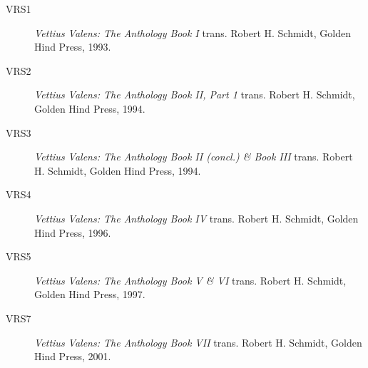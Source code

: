 \begin{description}
\item[VRS1] 
	\textsl{Vettius Valens: The Anthology Book I} trans. Robert H. Schmidt, Golden Hind Press, 1993.

\item[VRS2] 
	\textsl{Vettius Valens: The Anthology Book II, Part 1} trans. Robert H. Schmidt, Golden Hind Press, 1994.

\item[VRS3] 
	\textsl{Vettius Valens: The Anthology Book II (concl.) \& Book III} trans. Robert H. Schmidt, Golden Hind Press, 1994.

\item[VRS4] 
	\textsl{Vettius Valens: The Anthology Book IV} trans. Robert H. Schmidt, Golden Hind Press, 1996.

\item[VRS5] 
	\textsl{Vettius Valens: The Anthology Book V \& VI} trans. Robert H. Schmidt, Golden Hind Press, 1997.

\item[VRS7] 
	\textsl{Vettius Valens: The Anthology Book VII} trans. Robert H. Schmidt, Golden Hind Press, 2001.

\end{description}
\newpage
